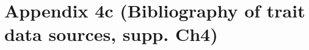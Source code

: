 \documentclass[openright,12pt,a4paper]{memoir}
\begin{document}
\clearpage


\clearpage


\clearpage


\clearpage


\clearpage


\clearpage

\backmatter


\clearpage


\clearpage


\clearpage


\clearpage


\clearpage


\clearpage


\clearpage

\chapter[Appendix 4c]{Appendix 4c (Bibliography of trait data sources, supp. Ch4)}

\clearpage


\clearpage


\clearpage

\end{document}

